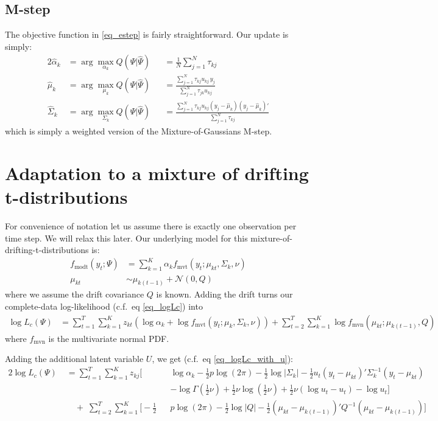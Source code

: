 \documentclass[11pt]{article}
\begin{document}
\subsection{M-step}

The objective function in \eqref{eq_estep} is fairly straightforward. Our update is simply:
\begin{alignat}{2}
	\hat\alpha_k &= \arg\max_{\alpha_k} Q(\Psi | \hat\Psi) &
		&= \frac{1}{N} \sum_{j=1}^N \tau_{kj} \\
	\hat\mu_k &= \arg\max_{\mu_k} Q(\Psi | \hat\Psi) &
		&= \frac{\sum_{j=1}^N \tau_{kj} u_{kj} \, y_j }{\sum_{j=1}^N \tau_{jk} u_{kj} } \\
	\hat\Sigma_k &= \arg\max_{\Sigma_k} Q(\Psi | \hat\Psi) &
		&= \frac{\sum_{j=1}^N \tau_{kj} u_{kj} (y_j - \hat\mu_k)(y_j - \hat\mu_k)'}
			{\sum_{j=1}^N \tau_{kj}}
\end{alignat}
which is simply a weighted version of the Mixture-of-Gaussians M-step.

\section{Adaptation to a mixture of drifting t-distributions}

For convenience of notation let us assume there is exactly one observation per time step. We will relax this later. Our underlying model for this mixture-of-drifting-t-distributions is:
\begin{align*}
	f_{\mathrm{modt}}(y_t; \Psi) &= \sum_{k=1}^K \alpha_k f_{\mathrm{mvt}}(y_t ; \mu_{kt}, \Sigma_k, \nu) \\
	\mu_{kt} &\sim \mu_{k(t-1)} + \mathcal{N}(0, Q)
\end{align*}
where we assume the drift covariance $Q$ is known. Adding the drift turns our complete-data log-likelihood (c.f.\ eq \ref{eq_logLc}) into
\begin{align*}
	\log L_c(\Psi) &= \sum_{t=1}^T \sum_{k=1}^K z_{kt} ( \log \alpha_k 
	+ \log f_{\mathrm{mvt}}(y_t; \mu_k, \Sigma_k, \nu) )
	+ \sum_{t=2}^T\sum_{k=1}^K \log f_{\mathrm{mvn}} (\mu_{kt}; \mu_{k(t-1)}, Q)
\end{align*}
where $f_{\mathrm{mvn}}$ is the multivariate normal PDF.

Adding the additional latent variable $U$, we get (c.f.\ eq \ref{eq_logLc_with_u}):
\begin{alignat}{2}
	\log L_c( \Psi) \; &= \sum_{t=1}^T \sum_{k=1}^K  z_{kj} \bigg[ 
		&&\log \alpha_k -\frac12 p \log(2\pi) -\frac12 \log |\Sigma_k| - \frac12 u_t (y_t - \mu_{kt})' \Sigma_k^{-1} (y_t - \mu_{kt}) \nonumber \\
		&& &- \log\Gamma(\frac12\nu) + \frac12\nu \log(\frac12\nu) + \frac12\nu(\log u_t - u_t) - \log u_t \bigg] \nonumber \\
		&\quad + \; \sum_{t=2}^T\sum_{k=1}^K \bigg[-\frac12 &&p \log (2\pi) - \frac12 \log |Q| 
			- \frac12(\mu_{kt} - \mu_{k(t-1)})' Q^{-1} (\mu_{kt} - \mu_{k(t-1)}) \bigg]
	\label{eq_logLc_u_drift}
\end{alignat}
\end{document}
